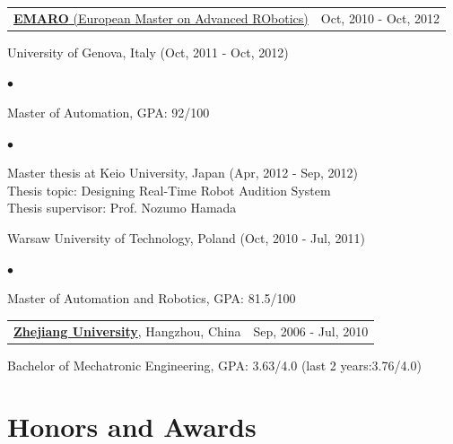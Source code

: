 \documentclass[margin,line]{res}
\newenvironment{list1}{
  \begin{list}{\ding{113}}{%
      \setlength{\itemsep}{0in}
      \setlength{\parsep}{0in} \setlength{\parskip}{0in}
      \setlength{\topsep}{0in} \setlength{\partopsep}{0in} 
      \setlength{\leftmargin}{0.17in}}}{\end{list}}
\newenvironment{list2}{
  \begin{list}{$\bullet$}{%
      \setlength{\itemsep}{0in}
      \setlength{\parsep}{0in} \setlength{\parskip}{0in}
      \setlength{\topsep}{0in} \setlength{\partopsep}{0in} 
      \setlength{\leftmargin}{0.2in}}}{\end{list}}
\begin{document}
\begin{resume}
\begin{tabularx}{\textwidth}{X r}
\href{http://emaro.irccyn.ec-nantes.fr/}{{\bf EMARO} (European Master on Advanced RObotics)} &Oct, 2010 - Oct, 2012\\
\end{tabularx}
\vspace*{-.1in}
\begin{list1}
\item[] University of Genova, Italy (Oct, 2011 - Oct, 2012)
\begin{list2}
\vspace*{.05in}
\item Master of Automation, GPA: 92/100
\end{list2}
\begin{list2}
\vspace*{.05in}
\item Master thesis at Keio University, Japan (Apr, 2012 - Sep, 2012)\\
Thesis topic: Designing Real-Time Robot Audition System\\
Thesis supervisor: Prof. Nozumo Hamada
\end{list2}
\end{list1}
\begin{list1}
\item[] Warsaw University of Technology, Poland (Oct, 2010 - Jul, 2011)
\begin{list2}
\vspace*{.05in}
\item Master of Automation and Robotics, GPA: 81.5/100
\end{list2}
\end{list1}

\begin{tabularx}{\textwidth}{X r}
\href{http://www.zju.edu.cn/english/}{{\bf Zhejiang University}}, Hangzhou, China   &Sep, 2006 - Jul, 2010\\
\end{tabularx}
\vspace*{-.1in}
\begin{list1}
\item[] Bachelor of Mechatronic Engineering, GPA: 3.63/4.0 (last 2 years:3.76/4.0)
\end{list1}

\section{\sc Honors and Awards} 
\begin{itemize}



\end{itemize}
\end{resume}
\end{document}
